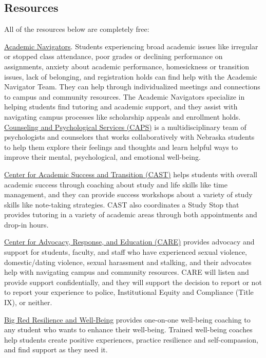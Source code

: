 \documentclass[12pt]{amsart}
\begin{document}
\subsection*{Resources}All of the resources below are completely {free}:
\medskip

\noindent
\href{https://executivevc.unl.edu/academic-navigator-team}{Academic Navigators}. Students experiencing broad academic issues like irregular or stopped class attendance, poor grades or declining performance on assignments, anxiety about academic performance, homesickness or transition issues, lack of belonging, and registration holds can find help with the Academic Navigator Team.  They can help through individualized meetings and connections to campus and community resources.  The Academic Navigators specialize in helping students find tutoring and academic support, and they assist with navigating campus processes like scholarship appeals and enrollment holds.
\medskip
\noindent
\href{https://caps.unl.edu}{Counseling and Psychological Services (CAPS)} 
is a multidisciplinary team of psychologists and counselors that works collaboratively with Nebraska students to help them explore their feelings and thoughts and learn helpful ways to improve their mental, psychological, and emotional well-being. 

\medskip
\noindent
\href{https://success.unl.edu}{Center for Academic Success and Transition (CAST)}
helps students with overall academic success through coaching about study and life skills like time management, and they can provide success workshops about a variety of study skills like note-taking strategies.  CAST also coordinates a Study Stop that provides tutoring in a variety of academic areas through both appointments and drop-in hours.

\medskip
\noindent
\href{https://care.unl.edu}{Center for Advocacy, Response, and Education (CARE)} 
provides advocacy and support for students, faculty, and staff who have experienced sexual violence, domestic/dating violence, sexual harassment and stalking, and their advocates help with navigating campus and community resources.  CARE will listen and provide support confidentially, and they will support the decision to report or not to report your experience to police, Institutional Equity and Compliance (Title IX), or neither. 

\medskip
\noindent
\href{https://resilience.unl.edu/home}{Big Red Resilience and Well-Being} provides one-on-one well-being coaching to any student who wants to enhance their well-being. Trained well-being coaches help students create positive experiences, practice resilience and self-compassion, and find support as they need it.
\end{document}
